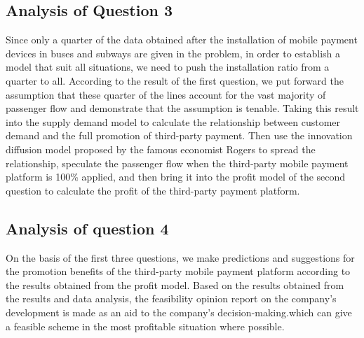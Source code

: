 \documentclass[../mcmpaper]{subfiles}
\begin{document}
\subsection{Analysis of Question 3}
Since only a quarter of the data obtained after the installation of mobile payment devices in buses and subways are given in the problem, in order to establish a model that suit all situations, we need to push the installation ratio from a quarter to all. According to the result of the first question, we put forward the assumption that these quarter of the lines account for the vast majority of passenger flow and demonstrate that the assumption is tenable. Taking this result into the supply demand model to calculate the relationship between customer demand and the full promotion of third-party payment. Then use the innovation diffusion model proposed by the famous economist Rogers to spread the relationship, speculate the passenger flow when the third-party mobile payment platform is 100\% applied, and then bring it into the profit model of the second question to calculate the profit of the third-party payment platform. 
\subsection{Analysis of question 4}
On the basis of the first three questions, we make predictions and suggestions for the promotion benefits of the third-party mobile payment platform according to the results obtained from the profit model. Based on the results obtained from the results and data analysis, the feasibility opinion report on the company's development is made as an aid to the company's decision-making.which can give a feasible scheme in the most profitable situation where possible.
\end{document}
